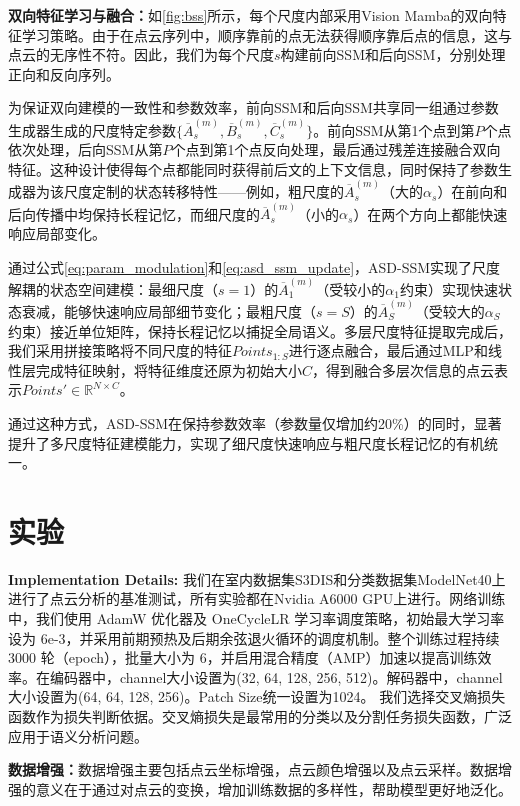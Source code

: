 \documentclass[preprint,12pt]{elsarticle}
\begin{document}
\textbf{双向特征学习与融合：}如\cref{fig:bss}所示，每个尺度内部采用Vision Mamba\cite{VisionMamba}的双向特征学习策略。由于在点云序列中，顺序靠前的点无法获得顺序靠后点的信息，这与点云的无序性不符。因此，我们为每个尺度$s$构建前向SSM和后向SSM，分别处理正向和反向序列。

为保证双向建模的一致性和参数效率，前向SSM和后向SSM共享同一组通过参数生成器生成的尺度特定参数$\{\overline{A}_s^{(m)}, \overline{B}_s^{(m)}, \overline{C}_s^{(m)}\}$。前向SSM从第1个点到第$P$个点依次处理，后向SSM从第$P$个点到第1个点反向处理，最后通过残差连接融合双向特征。这种设计使得每个点都能同时获得前后文的上下文信息，同时保持了参数生成器为该尺度定制的状态转移特性——例如，粗尺度的$\overline{A}_s^{(m)}$（大的$\alpha_s$）在前向和后向传播中均保持长程记忆，而细尺度的$\overline{A}_s^{(m)}$（小的$\alpha_s$）在两个方向上都能快速响应局部变化。

通过公式\ref{eq:param_modulation}和\ref{eq:asd_ssm_update}，ASD-SSM实现了尺度解耦的状态空间建模：最细尺度（$s=1$）的$\overline{A}_1^{(m)}$（受较小的$\alpha_1$约束）实现快速状态衰减，能够快速响应局部细节变化；最粗尺度（$s=S$）的$\overline{A}_S^{(m)}$（受较大的$\alpha_S$约束）接近单位矩阵，保持长程记忆以捕捉全局语义。多层尺度特征提取完成后，我们采用拼接策略将不同尺度的特征$Points_{1:S}$进行逐点融合，最后通过MLP和线性层完成特征映射，将特征维度还原为初始大小$C$，得到融合多层次信息的点云表示$Points'\in\mathbb{R}^{N\times C}$。

通过这种方式，ASD-SSM在保持参数效率（参数量仅增加约20\%）的同时，显著提升了多尺度特征建模能力，实现了细尺度快速响应与粗尺度长程记忆的有机统一。

\section{实验}
\textbf{Implementation Details:}
我们在室内数据集S3DIS和分类数据集ModelNet40上进行了点云分析的基准测试，所有实验都在Nvidia A6000 GPU上进行。网络训练中，我们使用 AdamW 优化器及 OneCycleLR 学习率调度策略，初始最大学习率设为 6e-3，并采用前期预热及后期余弦退火循环的调度机制。整个训练过程持续 3000 轮（epoch），批量大小为 6，并启用混合精度（AMP）加速以提高训练效率。在编码器中，channel大小设置为(32, 64, 128, 256, 512)。解码器中，channel大小设置为(64, 64, 128, 256)。Patch Size统一设置为1024。
我们选择交叉熵损失函数作为损失判断依据。交叉熵损失是最常用的分类以及分割任务损失函数，广泛应用于语义分析问题。

\textbf{数据增强：}数据增强主要包括点云坐标增强，点云颜色增强以及点云采样。数据增强的意义在于通过对点云的变换，增加训练数据的多样性，帮助模型更好地泛化。
\end{document}
